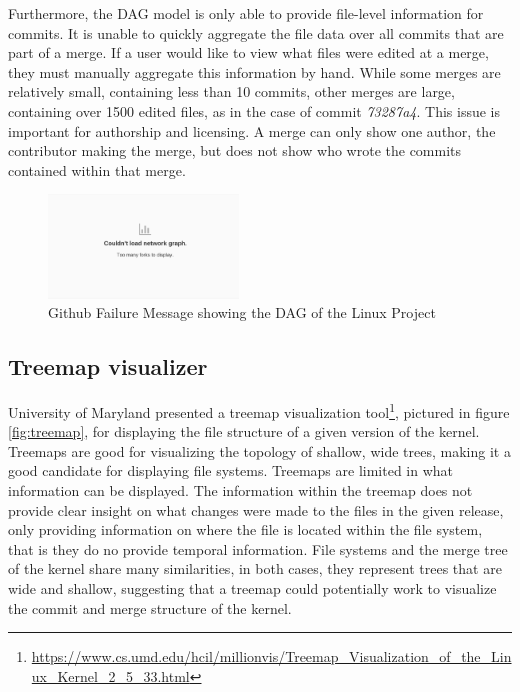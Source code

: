 \documentclass[conference, draftclsnofoot]{IEEEtran}
\begin{document}
Furthermore, the DAG model is only able to provide file-level information for
commits. It is unable to quickly aggregate the file data over all commits that
are part of a merge. If a user would like to view what files were edited at a merge,
they must manually aggregate this information by hand. While some merges are
relatively small, containing less than 10 commits, other merges are large,
containing over 1500 edited files, as in the case of commit \textit{73287a4}. This
issue is important for authorship and licensing. A merge can only show one author,
the contributor making the merge, but does not show who wrote the commits contained
within that merge.

\begin{figure}
        \centering
        \includegraphics[width=0.45\textwidth]{figures/github_viewer.png}
        \caption{Github Failure Message showing the DAG of the Linux Project}
        \label{fig:gitfail}
\end{figure}


\subsection{Treemap visualizer}

University of Maryland presented a treemap visualization
tool\footnote{\url{https://www.cs.umd.edu/hcil/millionvis/Treemap_Visualization_of_the_Linux_Kernel_2_5_33.html}},
pictured in figure \ref{fig:treemap}, for displaying the file structure of a given
version of the kernel. Treemaps are good for visualizing the topology of shallow,
wide trees, making it a good candidate for displaying file systems. Treemaps are
limited in what information can be displayed. The information within the treemap
does not provide clear insight on what changes were made to the files in the given
release, only providing information on where the file is located within the file
system, that is they do no provide temporal information. File systems and the merge
tree of the kernel share many similarities, in both cases, they represent trees that
are wide and shallow, suggesting that a treemap could potentially work to visualize
the commit and merge structure of the kernel.
\end{document}
